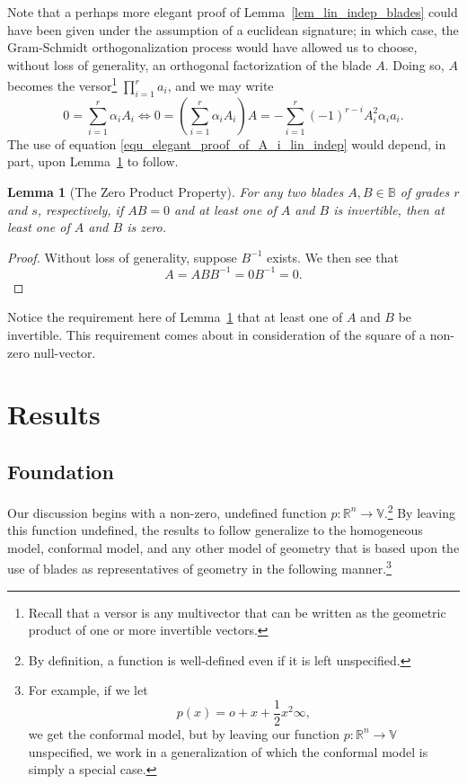 \documentclass{birkjour}
\newtheorem{lem}[thm]{Lemma}
\theoremstyle{definition}
\theoremstyle{remark}
\numberwithin{equation}{section}
\newcommand{\R}{\mathbb{R}}
\newcommand{\B}{\mathbb{B}}
\newcommand{\V}{\mathbb{V}}
\newcommand{\nvai}{\infty}
\newcommand{\nvao}{o}
\begin{document}
Note that a perhaps more elegant proof of Lemma~\ref{lem_lin_indep_blades} could have been given
under the assumption
of a euclidean signature; in which case, the Gram-Schmidt orthogonalization process would have
allowed us to choose, without loss of generality, an orthogonal factorization of the blade $A$.
Doing so, $A$ becomes the versor\footnote{Recall that a versor is any multivector that can
be written as the geometric product of one or more invertible vectors.} $\prod_{i=1}^r a_i$, and we may write
\begin{equation}\label{equ_elegant_proof_of_A_i_lin_indep}
0 = \sum_{i=1}^r \alpha_iA_i \iff
0=\left(\sum_{i=1}^r\alpha_iA_i\right)A = -\sum_{i=1}^r(-1)^{r-i}A_i^2\alpha_ia_i.
\end{equation}
The use of equation \eqref{equ_elegant_proof_of_A_i_lin_indep} would depend, in part, upon Lemma~\ref{lem_zero_prod_property} to follow.

\begin{lem}[The Zero Product Property]\label{lem_zero_prod_property}
For any two blades $A,B\in\B$ of grades $r$ and $s$, respectively, if $AB=0$ and at least one of $A$ and $B$
is invertible, then at least one of $A$ and $B$ is zero.
\end{lem}
\begin{proof}
Without loss of generality, suppose $B^{-1}$ exists.  We then see that
\begin{equation}
A=ABB^{-1}=0B^{-1}=0.
\end{equation}
\end{proof}

Notice the requirement here of Lemma~\ref{lem_zero_prod_property} that at least one of $A$ and $B$ be invertible.
This requirement comes about in consideration of the square of a non-zero null-vector.

\section{Results}

\subsection{Foundation}

Our discussion begins with a non-zero, undefined function $p:\R^n\to\V$.\footnote{By definition, a function is well-defined even if it is left unspecified.}
By leaving this function undefined, the results to follow generalize to the homogeneous model, conformal model,
and any other model of geometry that is based upon the use of blades as representatives of geometry in the
following manner.\footnote{For example, if we let
\begin{equation}\label{equ_p_conformal}
p(x)=\nvao+x+\frac{1}{2}x^2\nvai,
\end{equation}
we get the conformal model,
but by leaving our function $p:\R^n\to\V$ unspecified, we work in a generalization of which the conformal model
is simply a special case.}
\end{document}
